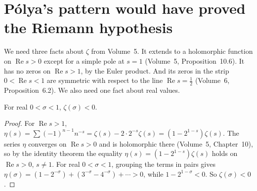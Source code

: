 \section{P\'olya's pattern would have proved the Riemann hypothesis}

We need three facts about $\zeta$ from Volume~5. It extends to a holomorphic function on $\operatorname{Re}s>0$ except for a simple pole at $s=1$
(Volume~5, Proposition~10.6). It has no zeros on $\operatorname{Re}s>1$, by the Euler product. And its zeros in the strip $0<\operatorname{Re}s<1$ are symmetric
with respect to the line $\operatorname{Re}s=\frac12$ (Volume~6, Proposition~6.2). We also need one fact about real values.

\begin{lemma}\label{conjectures:lem:zetaneg}
For real $0<\sigma<1$, $\zeta(\sigma)<0$.
\end{lemma}
\begin{proof}
For $\operatorname{Re}s>1$, $\eta(s)=\sum(-1)^{n-1}n^{-s}=\zeta(s)-2\cdot2^{-s}\zeta(s)=(1-2^{1-s})\zeta(s)$. The series $\eta$ converges on $\operatorname{Re}s>0$
and is holomorphic there (Volume~5, Chapter~10), so by the identity theorem the equality $\eta(s)=(1-2^{1-s})\zeta(s)$ holds on $\operatorname{Re}s>0$, $s\ne1$. For real
$0<\sigma<1$, grouping the terms in pairs gives $\eta(\sigma)=(1-2^{-\sigma})+(3^{-\sigma}-4^{-\sigma})+\cdots>0$, while $1-2^{1-\sigma}<0$. So $\zeta(\sigma)<0$.
\end{proof}


